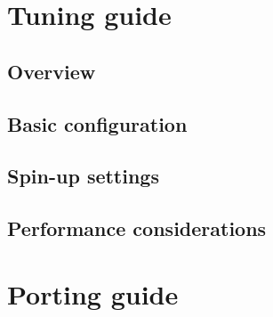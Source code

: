 \documentclass{zubaxdoc}
\begin{document}
\chapter{Tuning guide}

\section{Overview}

\section{Basic configuration}

\section{Spin-up settings}

\section{Performance considerations}

\chapter{Porting guide}\label{sec:porting_guide}
\end{document}
